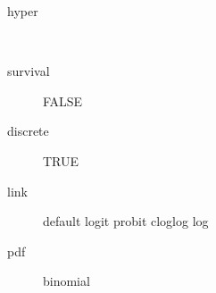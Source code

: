 \begin{description}
	\item[hyper]\ 
	 \item[ survival ] FALSE 
	 \item[ discrete ] TRUE 
	 \item[ link ] default logit probit cloglog log 
	 \item[ pdf ] binomial 
\end{description}
